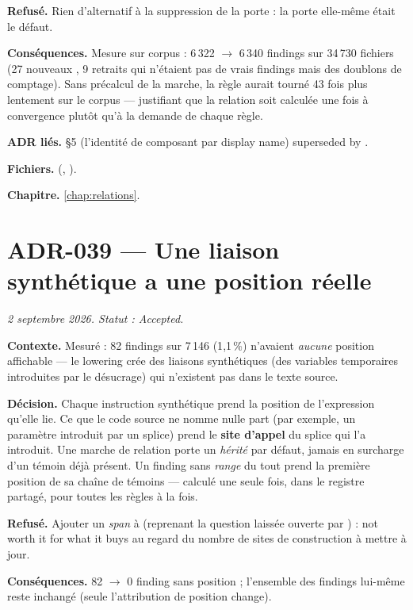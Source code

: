\textbf{Refusé.} Rien d'alternatif à la suppression de la porte : la porte
elle-même était le défaut.

\textbf{Conséquences.} Mesure sur corpus : 6\,322 $\to$ 6\,340 findings sur
34\,730 fichiers (27 nouveaux \Warning{}, 9 retraits qui n'étaient pas de
vrais findings mais des doublons de comptage). Sans précalcul de la marche, la
règle aurait tourné 43 fois plus lentement sur le corpus  ---
justifiant que la relation soit calculée une fois à convergence plutôt qu'à
la demande de chaque règle.

\textbf{ADR liés.} §5 (l'identité de composant par display name) superseded
by .

\textbf{Fichiers.}  (,
).

\textbf{Chapitre.} \cref{chap:relations}.

\section{ADR-039 --- Une liaison synthétique a une position réelle}
\label{adr:39}
\noindent\textit{2 septembre 2026. Statut : Accepted.}

\textbf{Contexte.} Mesuré : 82 findings sur 7\,146 (1{,}1\,\%) n'avaient
\emph{aucune} position affichable --- le lowering crée des liaisons
synthétiques (des variables temporaires introduites par le désucrage) qui
n'existent pas dans le texte source.

\textbf{Décision.} Chaque instruction synthétique prend la position de
l'expression qu'elle lie. Ce que le code source ne nomme nulle part (par
exemple, un paramètre introduit par un splice) prend le \textbf{site d'appel}
du splice qui l'a introduit. Une marche de relation porte un 
\emph{hérité} par défaut, jamais en surcharge d'un témoin déjà présent. Un
finding sans \emph{range} du tout prend la première position de sa chaîne de
témoins --- calculé une seule fois, dans le registre partagé, pour toutes les
règles à la fois.

\textbf{Refusé.} Ajouter un \emph{span} à 
(reprenant la question laissée ouverte par ) : \og not worth it for
what it buys\fg{} au regard du nombre de sites de construction à mettre à
jour.

\textbf{Conséquences.} 82 $\to$ 0 finding sans position ; l'ensemble des
findings lui-même reste inchangé (seule l'attribution de position change).

